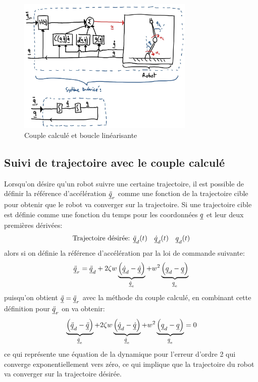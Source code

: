 \begin{figure}[htp]
	\centering
		\includegraphics[width=0.75\textwidth]{fig/computedtorque.jpg}
	\caption{Couple calculé et boucle linéarisante}
	\label{fig:computedtorque}
\end{figure}

\subsection{Suivi de trajectoire avec le couple calculé}

Lorsqu'on désire qu'un robot suivre une certaine trajectoire, il est possible de définir la référence d'accélération $\underline{\ddot{q}}_r$ comme une fonction de la trajectoire cible pour obtenir que le robot va converger sur la trajectoire. Si une trajectoire cible est définie comme une fonction du temps pour les coordonnées $\underline{q}$ et leur deux premières dérivées:
\begin{align}
\text{Trajectoire désirée: } \underline{\ddot{q}}_d(t) \quad \underline{\dot{q}}_d(t) \quad \underline{q}_d(t)
\end{align}
alors si on définie la référence d'accélération par la loi de commande suivante:
\begin{align}
\underline{\ddot{q}}_r = \underline{\ddot{q}}_d + 2 \zeta w 
\underbrace{\left( \underline{\dot{q}}_d - \underline{\dot{q}}\right)}_{ \underline{\dot{q}}_e}
+ w^2
\underbrace{\left( \underline{q}_d - \underline{q}\right)}_{ \underline{q}_e}
\end{align}
puisqu'on obtient $\underline{\ddot{q}} = \underline{\ddot{q}}_r$ avec la méthode du couple calculé, en combinant cette définition pour $\underline{\ddot{q}}_r$ on va obtenir:
\begin{align}
\underbrace{\left( \underline{\ddot{q}}_d - \underline{\ddot{q}} \right)}_{ \underline{\ddot{q}}_e}
 + 2 \zeta w 
\underbrace{\left( \underline{\dot{q}}_d - \underline{\dot{q}}\right)}_{ \underline{\dot{q}}_e}
+ w^2
\underbrace{\left( \underline{q}_d - \underline{q}\right)}_{ \underline{q}_e} = 0
\end{align}
ce qui représente une équation de la dynamique pour l'erreur d'ordre 2 qui converge exponentiellement vers zéro, ce qui implique que la trajectoire du robot va converger sur la trajectoire désirée.

